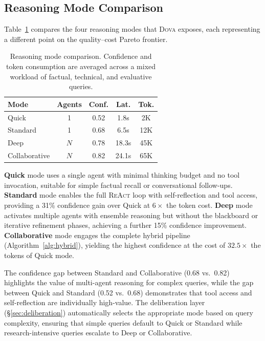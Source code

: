\documentclass{article}
\theoremstyle{plain}
\theoremstyle{definition}
\newcommand{\dova}{\textsc{Dova}}
\newcommand{\react}{\textsc{ReAct}}
\begin{document}
\subsection{Reasoning Mode Comparison}

Table~\ref{tab:modes} compares the four reasoning modes that \dova{} exposes,
each representing a different point on the quality--cost Pareto frontier.

\begin{table}[t]
\caption{Reasoning mode comparison.  Confidence and token consumption are
averaged across a mixed workload of factual, technical, and evaluative queries.}
\label{tab:modes}
\centering
\small
\begin{tabular}{@{}lcccc@{}}
\toprule
\textbf{Mode} & \textbf{Agents} & \textbf{Conf.} & \textbf{Lat.} & \textbf{Tok.} \\
\midrule
Quick          & 1   & 0.52 & 1.8s  & 2K   \\
Standard       & 1   & 0.68 & 6.5s  & 12K  \\
Deep           & $N$ & 0.78 & 18.3s & 45K  \\
Collaborative  & $N$ & 0.82 & 24.1s & 65K  \\
\bottomrule
\end{tabular}
\end{table}

\textbf{Quick} mode uses a single agent with minimal thinking budget and no
tool invocation, suitable for simple factual recall or conversational
follow-ups.  \textbf{Standard} mode enables the full \react{} loop with
self-reflection and tool access, providing a 31\% confidence gain over Quick at
$6\times$ the token cost.  \textbf{Deep} mode activates multiple agents with
ensemble reasoning but without the blackboard or iterative refinement phases,
achieving a further 15\% confidence improvement.  \textbf{Collaborative} mode
engages the complete hybrid pipeline (Algorithm~\ref{alg:hybrid}), yielding
the highest confidence at the cost of $32.5\times$ the tokens of Quick mode.

The confidence gap between Standard and Collaborative (0.68 vs.\ 0.82)
highlights the value of multi-agent reasoning for complex queries, while the
gap between Quick and Standard (0.52 vs.\ 0.68) demonstrates that tool access
and self-reflection are individually high-value.  The deliberation layer
(\S\ref{sec:deliberation}) automatically selects the appropriate mode based on
query complexity, ensuring that simple queries default to Quick or Standard
while research-intensive queries escalate to Deep or Collaborative.
\end{document}
